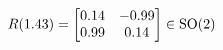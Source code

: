 \documentclass[preview]{standalone}
\begin{document}
\begin{align*}
\special{dvisvgm:raw <g id='unique000'>}R(1.43) = \begin{bmatrix} 0.14 & -0.99 \\ 0.99 & 0.14 \end{bmatrix} \in \text{SO}(2)\special{dvisvgm:raw </g>}
\end{align*}
\end{document}
